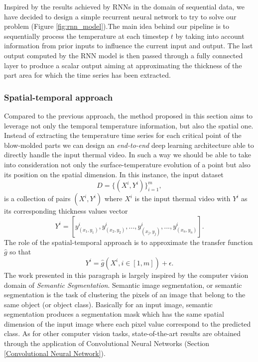 Inspired by the results achieved by RNNs in the domain of sequential data, we have decided to design a simple recurrent neural network to try to solve our problem (Figure \ref{fig:rnn_model}).The main idea behind our pipeline is to sequentially process the temperature at each timestep $t$ by taking into account information from prior inputs to influence the current input and output. The last output computed by the RNN model is then passed through a fully connected layer to produce a scalar output aiming at approximating the thickness of the part area for which the time series has been extracted.

\subsubsection{Spatial-temporal approach} \label{Spatial-temporal approach}

Compared to the previous approach, the method proposed in this section aims to leverage not only the temporal temperature information, but also the spatial one. Instead of extracting the temperature time series for each critical point of the blow-molded parts we can design an \textit{end-to-end} deep learning architecture able to directly handle the input thermal video. In such a way we should be able to take into consideration not only the surface-temperature evolution of a point but also its position on the spatial dimension. 
In this instance, the input dataset
\begin{equation}
    D = \{(X^{i}, Y^{i})\}_{i=1}^{m},
\end{equation}
is a collection of pairs $(X^{i}, Y^{i})$ where $X^{i}$ is the input thermal video with $Y^{i}$ as its corresponding thickness values vector
\begin{equation}
    Y^{i} = [y^{i}_{(x_1, y_1)}, y^{i}_{(x_2, y_2)}, ..., y^{i}_{(x_j, y_j)}, ..., y^{i}_{(x_n, y_n)}].
\end{equation}
The role of the spatial-temporal approach is to approximate the transfer function $\hat{g}$ so that
\begin{equation}
    Y^{i} = \hat{g}(X^{i}, i \in [1, m]) + \epsilon.
\end{equation}
The work presented in this paragraph is largely inspired by the computer vision domain of \textit{Semantic Segmentation}. Semantic image segmentation, or semantic segmentation is the task of clustering the pixels of an image that belong to the same object (or object class). Basically for an input image, semantic segmentation produces a segmentation mask which has the same spatial dimension of the input image where each pixel value correspond to the predicted class. As for other computer vision tasks, state-of-the-art results are obtained through the application of Convolutional Neural Networks (Section \ref{Convolutional Neural Network}).

